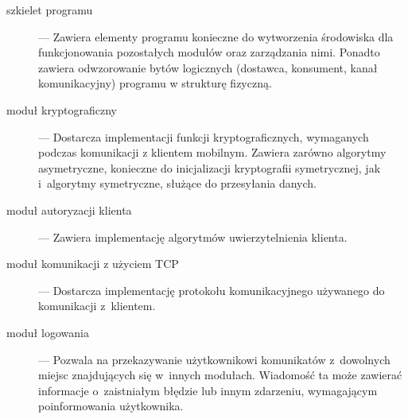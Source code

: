 \begin{description}
\item[szkielet programu] --- Zawiera elementy programu konieczne do
  wytworzenia środowiska dla funkcjonowania pozostałych modułów oraz
  zarządzania nimi. Ponadto zawiera odwzorowanie bytów logicznych
  (dostawca, konsument, kanał komunikacyjny) programu w strukturę
  fizyczną.
\item[moduł kryptograficzny] --- Dostarcza implementacji funkcji
  kryptograficznych, wymaganych podczas komunikacji z klientem
  mobilnym. Zawiera zarówno algorytmy asymetryczne, konieczne do
  inicjalizacji kryptografii symetrycznej, jak i~algorytmy
  symetryczne, służące do przesyłania danych.
\item[moduł autoryzacji klienta] --- Zawiera implementację algorytmów
  uwierzytelnienia klienta.
\item[moduł komunikacji z użyciem TCP] --- Dostarcza implementację
  protokołu komunikacyjnego używanego do komunikacji z~klientem.
\item[moduł logowania] --- Pozwala na przekazywanie użytkownikowi
  komunikatów z~dowolnych miejsc znajdujących się w~innych
  modułach. Wiadomość ta może zawierać informacje o~zaistniałym
  błędzie lub innym zdarzeniu, wymagającym poinformowania użytkownika.
\end{description}

